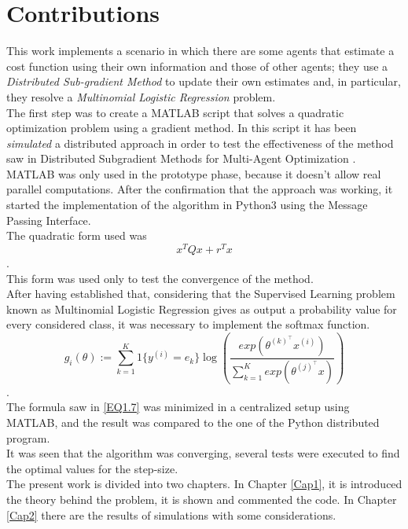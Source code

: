 \documentclass[a4paper,11pt,oneside]{book}
\begin{document}
\section*{Contributions}
This work implements a scenario in which there are some agents that estimate a cost function using their own information and those of other agents; they use a \textit{Distributed Sub-gradient Method} to update their own estimates and, in particular, they resolve a \textit{Multinomial Logistic Regression} problem.\\

The first step was to create a MATLAB script that solves a quadratic optimization problem using a gradient method. In this script it has been \textit{simulated} a distributed approach in order to test the effectiveness of the method saw in Distributed Subgradient Methods for Multi-Agent Optimization \cite{CITATION:1}. MATLAB was only used in the prototype phase, because it doesn't allow real parallel computations. After the confirmation that the approach was working, it started the implementation of the algorithm in Python3 using the Message Passing Interface.\\
The quadratic form used was 
\begin{equation} \tag{I}
x^{T}Qx + r^{T}x
\end{equation}. \\
This form was used only to test the convergence of the method.\\
After having established that, considering that the Supervised Learning problem known as Multinomial Logistic Regression gives as output a probability value for every considered class, it was necessary to implement the softmax function. 
\begin{equation} \tag{II}
g_i\left(\theta\right):=\sum_{k=1}^{K}{1\{y^{(i)}=e_k\}\log{\left( \frac{exp(\theta^{(k)^\top}x^{(i)})}{\sum_{k=1}^{K}{exp( \theta^{(j)^\top}x )}} \right)}}
\end{equation} \cite{CITATION:3}. \\
The formula saw in \ref{EQ1.7} was minimized in a centralized setup using MATLAB, and the result was compared to the one of the Python distributed program.\\
It was seen that the algorithm was converging, several tests were executed to find the optimal values for the step-size.\\
The present work is divided into two chapters. In Chapter \ref{Cap1}, it is introduced the theory behind the problem, it is shown and commented the code. In Chapter \ref{Cap2} there are the results of simulations with some considerations.
\end{document}
